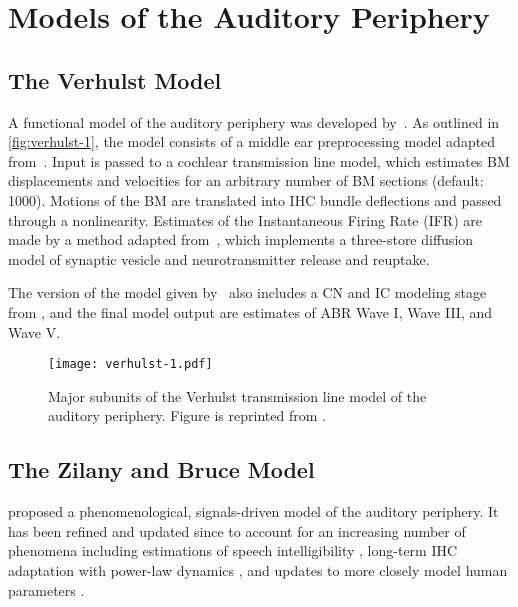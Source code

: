 \section{Models of the Auditory Periphery} %
\label{sec:models_of_the_auditory_periphery}
\subsection{The Verhulst Model} %
\label{sub:the_verhulst_model}
A functional model of the auditory periphery was developed by~\cite{Verhulst2015Functional}.  As outlined in \autoref{fig:verhulst-1}, the model consists of a middle ear preprocessing model adapted from~\cite{Meddis2010Computational}.  Input is passed to a cochlear transmission line model, which estimates BM displacements and velocities for an arbitrary number of BM sections (default: 1000).  Motions of the BM are translated into IHC bundle deflections and passed through a nonlinearity.  Estimates of the Instantaneous Firing Rate (IFR) are made by a method adapted from~\cite{Westerman1988Diffusion}, which implements a three-store diffusion model of synaptic vesicle and neurotransmitter release and reuptake.  

The version of the model given by~\cite{Verhulst2015Functional} also includes a CN and IC modeling stage from \cite{Nelson2004Phenomenological}, and the final model output are estimates of ABR Wave I, Wave III, and Wave V. 

\begin{figure}[htbp]
	\centering
	\texttt{[image: verhulst-1.pdf]}
	\caption[The Verhulst Model]{Major subunits of the Verhulst transmission line model of the auditory periphery.  Figure is reprinted from \cite{Verhulst2015Functional}.}
	\label{fig:verhulst-1}
\end{figure}


\subsection{The Zilany and Bruce Model} %
\label{sub:the_zilany_and_bruce_model}
\cite{Zilany2006Modeling} proposed a phenomenological, signals-driven model of the auditory periphery.  It has been refined and updated since to account for an increasing number of phenomena including estimations of speech intelligibility \citep{Zilany2007Predictions}, long-term IHC adaptation with power-law dynamics \citep{Zilany2009Phenomenological}, and updates to more closely model human parameters \citep{Zilany2014Updated}.  

